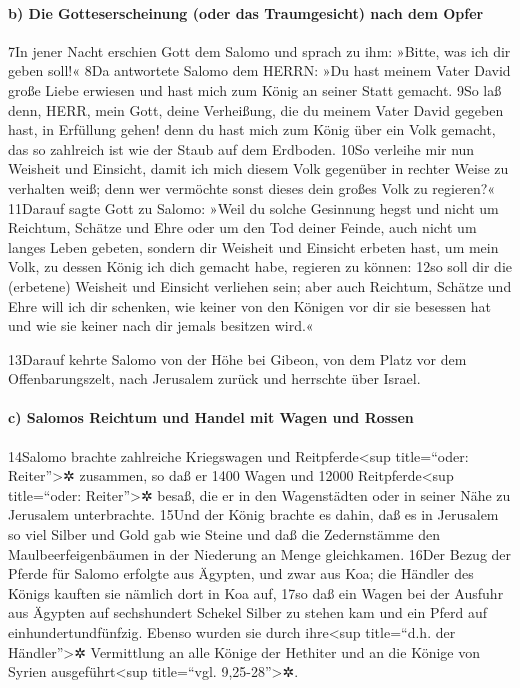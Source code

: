 \hypertarget{b-die-gotteserscheinung-oder-das-traumgesicht-nach-dem-opfer}{%
\paragraph{b) Die Gotteserscheinung (oder das Traumgesicht) nach dem
Opfer}\label{b-die-gotteserscheinung-oder-das-traumgesicht-nach-dem-opfer}}

7In jener Nacht erschien Gott dem Salomo und sprach zu ihm: »Bitte, was
ich dir geben soll!« 8Da antwortete Salomo dem HERRN: »Du hast meinem
Vater David große Liebe erwiesen und hast mich zum König an seiner Statt
gemacht. 9So laß denn, HERR, mein Gott, deine Verheißung, die du meinem
Vater David gegeben hast, in Erfüllung gehen! denn du hast mich zum
König über ein Volk gemacht, das so zahlreich ist wie der Staub auf dem
Erdboden. 10So verleihe mir nun Weisheit und Einsicht, damit ich mich
diesem Volk gegenüber in rechter Weise zu verhalten weiß; denn wer
vermöchte sonst dieses dein großes Volk zu regieren?« 11Darauf sagte
Gott zu Salomo: »Weil du solche Gesinnung hegst und nicht um Reichtum,
Schätze und Ehre oder um den Tod deiner Feinde, auch nicht um langes
Leben gebeten, sondern dir Weisheit und Einsicht erbeten hast, um mein
Volk, zu dessen König ich dich gemacht habe, regieren zu können: 12so
soll dir die (erbetene) Weisheit und Einsicht verliehen sein; aber auch
Reichtum, Schätze und Ehre will ich dir schenken, wie keiner von den
Königen vor dir sie besessen hat und wie sie keiner nach dir jemals
besitzen wird.«

13Darauf kehrte Salomo von der Höhe bei Gibeon, von dem Platz vor dem
Offenbarungszelt, nach Jerusalem zurück und herrschte über Israel.

\hypertarget{c-salomos-reichtum-und-handel-mit-wagen-und-rossen}{%
\paragraph{c) Salomos Reichtum und Handel mit Wagen und
Rossen}\label{c-salomos-reichtum-und-handel-mit-wagen-und-rossen}}

14Salomo brachte zahlreiche Kriegswagen und Reitpferde\textless sup
title=``oder: Reiter''\textgreater✲ zusammen, so daß er 1400 Wagen und
12000 Reitpferde\textless sup title=``oder: Reiter''\textgreater✲ besaß,
die er in den Wagenstädten oder in seiner Nähe zu Jerusalem
unterbrachte. 15Und der König brachte es dahin, daß es in Jerusalem so
viel Silber und Gold gab wie Steine und daß die Zedernstämme den
Maulbeerfeigenbäumen in der Niederung an Menge gleichkamen. 16Der Bezug
der Pferde für Salomo erfolgte aus Ägypten, und zwar aus Koa; die
Händler des Königs kauften sie nämlich dort in Koa auf, 17so daß ein
Wagen bei der Ausfuhr aus Ägypten auf sechshundert Schekel Silber zu
stehen kam und ein Pferd auf einhundertundfünfzig. Ebenso wurden sie
durch ihre\textless sup title=``d.h. der Händler''\textgreater✲
Vermittlung an alle Könige der Hethiter und an die Könige von Syrien
ausgeführt\textless sup title=``vgl. 9,25-28''\textgreater✲.

